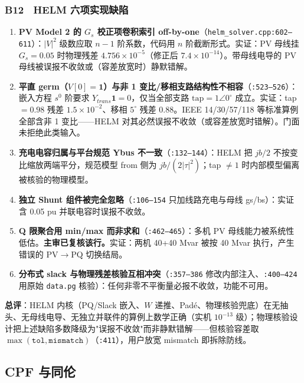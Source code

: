 \documentclass[11pt,a4paper,fontset=fandol]{ctexart}
\newcommand{\file}[1]{\texttt{#1}}
\begin{document}
\subsubsection*{B12　HELM 六项实现缺陷}
\begin{enumerate}
  \item \textbf{PV Model 2 的 $G_s$ 校正项卷积索引 off-by-one}（\file{helm\_solver.cpp:602--611}）：$|V|^2$ 级数应取 $n-1$ 阶系数，代码用 $n$ 阶截断形式。实证：PV 母线挂 $G_s=0.05$ 时物理残差 $4.756\times10^{-5}$（修正后 $7.4\times10^{-14}$）。带母线电导的 PV 母线被误报不收敛或（容差放宽时）静默错解。
  \item \textbf{平直 germ（$V[0]=\bm{1}$）与非 1 变比/移相支路结构性不相容}（\file{:523--526}）：嵌入方程 $s^0$ 阶要求 $Y_{trans}\bm{1}=0$，仅当全部支路 $\mathrm{tap}=1\angle0^\circ$ 成立。实证：tap $=0.98$ 残差 $1.5\times10^{-2}$、移相 $5^\circ$ 残差 0.88。IEEE 14/30/57/118 等标准算例全部含非 1 变比——HELM 对其必然误报不收敛（或容差放宽时错解）。门面未拒绝此类输入。
  \item \textbf{充电电容归属与平台规范 Ybus 不一致}（\file{:132--144}）：HELM 把 $jb/2$ 不按变比缩放两端平分，规范模型 from 侧为 $jb/(2|\tau|^2)$；tap $\neq 1$ 时内部模型偏离被核验的物理模型。
  \item \textbf{独立 Shunt 组件被完全忽略}（\file{:106--154} 只加线路充电与母线 gs/bs）：实证含 0.05 pu 并联电容时误报不收敛。
  \item \textbf{Q 限聚合用 min/max 而非求和}（\file{:462--465}）：多机 PV 母线能力被系统性低估。\textbf{主审已复核该行。}实证：两机 40+40 Mvar 被按 40 Mvar 执行，产生错误的 PV$\to$PQ 切换结局。
  \item \textbf{分布式 slack 与物理残差核验互相冲突}（\file{:357--386} 修改内部注入、\file{:400--424} 用原始 \texttt{data.pg} 核验）：任何非零不平衡量必报不收敛，功能不可用。
\end{enumerate}
\textbf{总评}：HELM 内核（PQ/Slack 嵌入、$W$ 递推、Padé、物理核验兜底）在无抽头、无母线电导、无独立并联件的算例上数学正确（实机 $10^{-13}$ 级）；物理核验设计把上述缺陷多数降级为"误报不收敛"而非静默错解——但核验容差取 $\max(\texttt{tol}, \texttt{mismatch})$（\file{:411}），用户放宽 mismatch 即拆除防线。

\subsection{CPF 与同伦}
\end{document}
